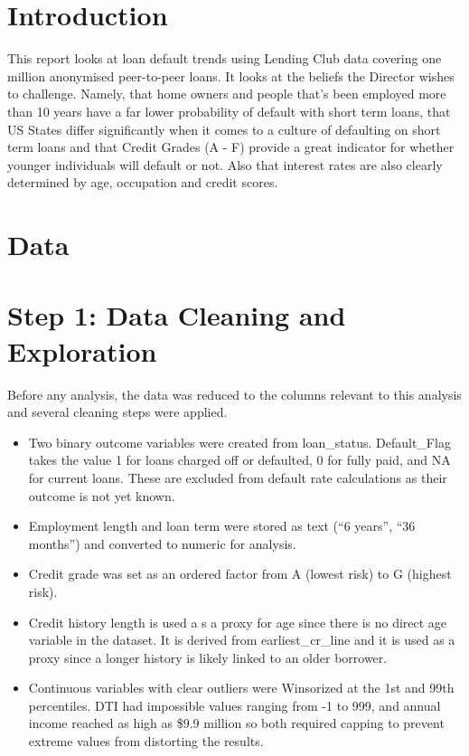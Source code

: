 \documentclass[11pt,preprint]{elsarticle}
\numberwithin{equation}{section}
\numberwithin{figure}{section}
\numberwithin{table}{section}
\begin{document}
\section{\texorpdfstring{Introduction
\label{Introduction}}{Introduction }}\label{introduction}

This report looks at loan default trends using Lending Club data
covering one million anonymised peer-to-peer loans. It looks at the
beliefs the Director wishes to challenge. Namely, that home owners and
people that's been employed more than 10 years have a far lower
probability of default with short term loans, that US States differ
significantly when it comes to a culture of defaulting on short term
loans and that Credit Grades (A - F) provide a great indicator for
whether younger individuals will default or not. Also that interest
rates are also clearly determined by age, occupation and credit scores.

\section*{Data}\label{data}

\section{Step 1: Data Cleaning and
Exploration}\label{step-1-data-cleaning-and-exploration}

Before any analysis, the data was reduced to the columns relevant to
this analysis and several cleaning steps were applied.

\begin{itemize}
\item
  Two binary outcome variables were created from loan\_status.
  Default\_Flag takes the value 1 for loans charged off or defaulted, 0
  for fully paid, and NA for current loans. These are excluded from
  default rate calculations as their outcome is not yet known.
\item
  Employment length and loan term were stored as text (``6 years'', ``36
  months'') and converted to numeric for analysis.
\item
  Credit grade was set as an ordered factor from A (lowest risk) to G
  (highest risk).
\item
  Credit history length is used a s a proxy for age since there is no
  direct age variable in the dataset. It is derived from
  earliest\_cr\_line and it is used as a proxy since a longer history is
  likely linked to an older borrower.
\item
  Continuous variables with clear outliers were Winsorized at the 1st
  and 99th percentiles. DTI had impossible values ranging from -1 to
  999, and annual income reached as high as \$9.9 million so both
  required capping to prevent extreme values from distorting the
  results.
\end{itemize}
\end{document}
